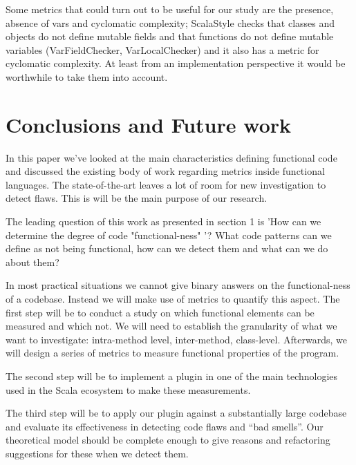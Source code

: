 \documentclass{article}
\begin{document}
Some metrics that could turn out to be useful for our study are  the presence, absence of vars and cyclomatic complexity; ScalaStyle checks that classes and objects do not define mutable fields and that functions do not define mutable variables (VarFieldChecker, VarLocalChecker) \cite{scalastyle} and it also has a metric for cyclomatic complexity. At least from an implementation perspective it would be worthwhile to take them into account.\par

\section{Conclusions and Future work}
In this paper we've looked at the main characteristics defining functional code and discussed the existing body of work regarding metrics inside functional languages. The state-of-the-art leaves a lot of room for new investigation to detect flaws. This is will be the main purpose of our research.

The leading question of this work as presented in  section 1  is  'How can we determine the degree of code "functional-ness" '? What code patterns can we define as not being functional, how can we detect them and what can we do about them? \par

In most practical situations we cannot give binary answers on the functional-ness of a codebase. Instead we will make use of metrics to quantify this aspect. The first step will be to conduct a study on which functional elements can be measured and which not. We will need to establish the granularity of what we want to investigate: intra-method level, inter-method, class-level. Afterwards, we will design a series of metrics to measure functional properties of the program. \par

The second step will be to implement a plugin in one of the main technologies used in the Scala ecosystem to make these measurements.\par

The third step will be to apply our plugin against a substantially large codebase and evaluate its effectiveness in detecting code flaws and ``bad smells''. Our theoretical model should be complete enough to give reasons and refactoring suggestions for these when we detect them.



\newpage


 

\end{document}
